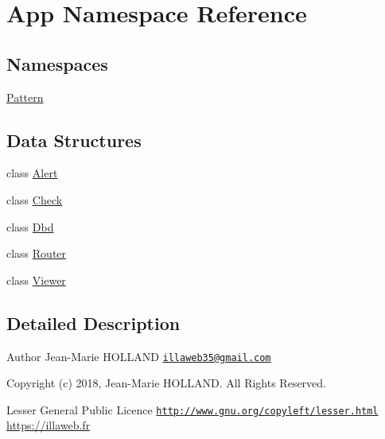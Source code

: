 \hypertarget{namespace_app}{}\section{App Namespace Reference}
\label{namespace_app}
\subsection*{Namespaces}
\begin{DoxyCompactItemize}
\item 
 \hyperlink{namespace_app_1_1_pattern}{Pattern}
\end{DoxyCompactItemize}
\subsection*{Data Structures}
\begin{DoxyCompactItemize}
\item 
class \hyperlink{class_app_1_1_alert}{Alert}
\item 
class \hyperlink{class_app_1_1_check}{Check}
\item 
class \hyperlink{class_app_1_1_dbd}{Dbd}
\item 
class \hyperlink{class_app_1_1_router}{Router}
\item 
class \hyperlink{class_app_1_1_viewer}{Viewer}
\end{DoxyCompactItemize}


\subsection{Detailed Description}
\begin{DoxyAuthor}{Author}
Jean-\/\+Marie H\+O\+L\+L\+A\+ND \href{mailto:illaweb35@gmail.com}{\tt illaweb35@gmail.\+com} 
\end{DoxyAuthor}
\begin{DoxyCopyright}{Copyright}
(c) 2018, Jean-\/\+Marie H\+O\+L\+L\+A\+ND. All Rights Reserved.
\end{DoxyCopyright}
Lesser General Public Licence \href{http://www.gnu.org/copyleft/lesser.html}{\tt http\+://www.\+gnu.\+org/copyleft/lesser.\+html} \hyperlink{}{https\+://illaweb.\+fr}